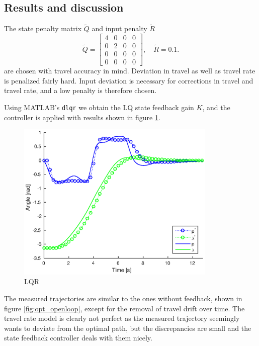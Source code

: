 \subsection{Results and discussion}

The state penalty matrix $\tilde{Q}$ and input penalty $\tilde{R}$
\begin{equation*}
\tilde{Q} = \begin{bmatrix}4&0&0&0\\0&2&0&0\\0&0&0&0\\0&0&0&0\end{bmatrix}, \quad \tilde{R} = 0.1.
\end{equation*}
are chosen with travel accuracy in mind. Deviation in travel as well as travel rate is penalized fairly hard. Input deviation is necessary for corrections in travel and travel rate, and a low penalty is therefore chosen.

Using MATLAB's \texttt{dlqr} we obtain the LQ state feedback gain $K$, and the controller is applied with results shown in figure \ref{fig:lqr}.

\begin{figure}[hp]
	\centering
		\includegraphics[width=0.85\textwidth]{figures/3/closedloop.eps}
	\caption{LQR}
	\label{fig:lqr}
\end{figure}


The measured trajectories are similar to the ones without feedback, shown in figure \ref{fig:opt_openloop}, except for the removal of travel drift over time. The travel rate model is clearly not perfect as the measured trajectory seemingly wants to deviate from the optimal path, but the discrepancies are small and the state feedback controller deals with them nicely.


